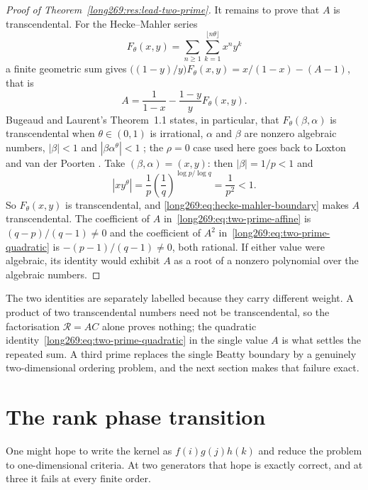 \begin{proof}[Proof of Theorem~\ref{long269:res:lead-two-prime}]
It remains to prove that $A$ is transcendental.  For the Hecke--Mahler series
\[
 F_\theta(x,y)=\sum_{n\ge1}\sum_{k=1}^{\lfloor n\theta\rfloor}x^ny^k
\]
a finite geometric sum gives
$\bigl((1-y)/y\bigr)F_\theta(x,y)=x/(1-x)-(A-1)$, that is
\begin{equation}\label{long269:eq:hecke-mahler-boundary}
 A=\frac1{1-x}-\frac{1-y}{y}F_\theta(x,y).
\end{equation}
Bugeaud and Laurent's Theorem~1.1 states, in particular, that
$F_\theta(\beta,\alpha)$ is transcendental when $\theta\in(0,1)$ is irrational,
$\alpha$ and $\beta$ are nonzero algebraic numbers, $|\beta|<1$ and
$|\beta\alpha^\theta|<1$ \cite[p.~61, Theorem~1.1]{bugeaudlaurent2023}; the
$\rho=0$ case used here goes back to Loxton and van der Poorten
\cite[p.~40, Theorem~8]{loxtonvdp1977}.  Take $(\beta,\alpha)=(x,y)$: then
$|\beta|=1/p<1$ and
\[
 |xy^{\theta}|=\frac1p\left(\frac1q\right)^{\log p/\log q}=\frac1{p^{2}}<1 .
\]
So $F_\theta(x,y)$ is transcendental, and \eqref{long269:eq:hecke-mahler-boundary}
makes $A$ transcendental.  The coefficient of $A$
in~\eqref{long269:eq:two-prime-affine} is $(q-p)/(q-1)\ne0$ and the coefficient of
$A^{2}$ in~\eqref{long269:eq:two-prime-quadratic} is $-(p-1)/(q-1)\ne0$, both rational.
If either value were algebraic, its identity would exhibit $A$ as a root of a
nonzero polynomial over the algebraic numbers.
\end{proof}

\noindent The two identities are separately labelled
\label{long269:res:two-prime-transcendence}\label{long269:res:two-prime-repeated-transcendence}
because they carry different weight.  A product of two transcendental numbers
need not be transcendental, so the factorisation $\mathcal R=AC$ alone proves
nothing; the quadratic identity~\eqref{long269:eq:two-prime-quadratic} in the single
value $A$ is what settles the repeated sum.  A third prime replaces the single
Beatty boundary by a genuinely two-dimensional ordering problem, and the next
section makes that failure exact.

\section{The rank phase transition}\label{long269:sec:rank}

One might hope to write the kernel as $f(i)g(j)h(k)$ and reduce the problem to
one-dimensional criteria.  At two generators that hope is exactly correct, and
at three it fails at every finite order.

